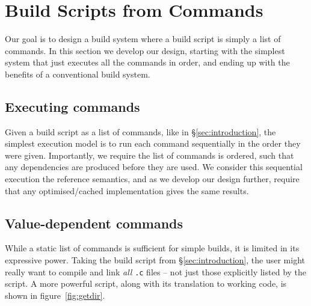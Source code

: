 \section{Build Scripts from Commands}
\label{sec:design}

Our goal is to design a build system where a build script is simply a list of commands. In this section we develop our design, starting with the simplest system that just executes all the commands in order, and ending up with the benefits of a conventional build system.

\subsection{Executing commands}
\label{sec:executing_commands}

Given a build script as a list of commands, like in \S\ref{sec:introduction}, the simplest execution model is to run each command sequentially in the order they were given. Importantly, we require the list of commands is ordered, such that any dependencies are produced before they are used. We consider this sequential execution the reference semantics, and as we develop our design further, require that any optimised/cached implementation gives the same results.

\subsection{Value-dependent commands}
\label{sec:monadic}

While a static list of commands is sufficient for simple builds, it is
limited in its expressive power. Taking the build script from
\S\ref{sec:introduction}, the user might really want to compile and
link \emph{all} \texttt{.c} files -- not just those explicitly listed
by the script. A more powerful script, along with its translation to
working \Rattle code, is shown in figure~\ref{fig:getdir}.


